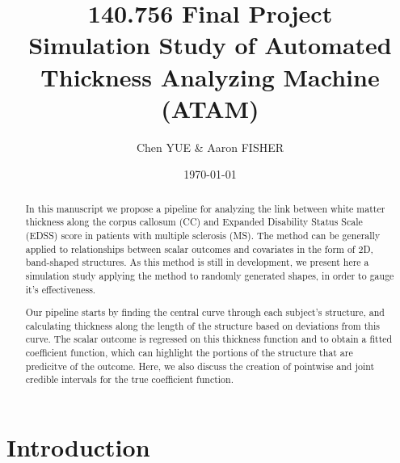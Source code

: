 \documentclass[12pt]{article}
\begin{document}
\title{140.756 Final Project\\Simulation Study of Automated Thickness Analyzing Machine (ATAM)}
\author{Chen YUE \& Aaron FISHER} %
\date{\today}
\maketitle
\begin{abstract}

In this manuscript we propose a pipeline for analyzing the link between white matter thickness along the corpus callosum (CC) and Expanded Disability Status Scale (EDSS) score in patients with multiple sclerosis (MS). The method can be generally applied to relationships between scalar outcomes and covariates in the form of 2D, band-shaped structures. As this method is still in development, we present here a simulation study applying the method to randomly generated shapes, in order to gauge it's effectiveness.

Our pipeline starts by finding the central curve through each subject's structure, and calculating thickness along the length of the structure based on deviations from this curve. The scalar outcome is regressed on this thickness function and to obtain a fitted coefficient function, which can highlight the portions of the structure that are predicitve of the outcome. Here, we also discuss the creation of pointwise and joint credible intervals for the true coefficient function.

\end{abstract}

\section{Introduction}
\end{document}

